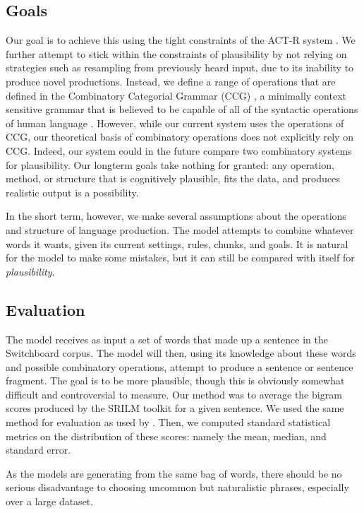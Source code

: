 \subsection{Goals}
Our goal is to achieve this using the tight constraints of the ACT-R system \citep{actr}. We further attempt to stick within the constraints of plausibility by not relying on strategies such as resampling from previously heard input, due to its inability to produce novel productions. Instead, we define a range of operations that are defined in the Combinatory Categorial Grammar (CCG) \citep{ccg}, a minimally context sensitive grammar that is believed to be capable of all of the syntactic operations of human language \citep{convergence}. However, while our current system uses the operations of CCG, our theoretical basis of combinatory operations does not explicitly rely on CCG. Indeed, our system could in the future compare two combinatory systems for plausibility. Our longterm goals take nothing for granted: any operation, method, or structure that is cognitively plausible, fits the data, and produces realistic output is a possibility. 

In the short term, however, we make several assumptions about the operations and structure of language production. The model attempts to combine whatever words it wants, given its current settings, rules, chunks, and goals. It is natural for the model to make some mistakes, but it can still be compared with itself for \textit{plausibility}.

\subsection{Evaluation}
The model receives as input a set of words that made up a sentence in the Switchboard corpus. The model will then, using its knowledge about these words and possible combinatory operations, attempt to produce a sentence or sentence fragment. The goal is to be more plausible, though this is obviously somewhat difficult and controversial to measure. Our method was to average the bigram scores produced by the SRILM toolkit \citep{srilm} for a given sentence. We used the same method for evaluation as used by \citet{chart}. Then, we computed standard statistical metrics on the distribution of these scores: namely the mean, median, and standard error.

As the models are generating from the same bag of words, there should be no serious disadvantage to choosing uncommon but naturalistic phrases, especially over a large dataset. 